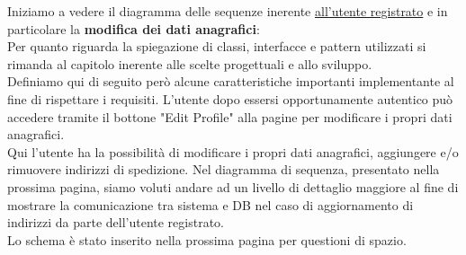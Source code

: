 \documentclass[a4paper,11pt]{report}
\begin{document}
\leavevmode \newline
Iniziamo a vedere il diagramma delle sequenze inerente \underline{all'utente registrato} e in particolare la \textbf{modifica dei dati anagrafici}:\\
Per quanto riguarda la spiegazione di classi, interfacce e pattern utilizzati si rimanda al capitolo inerente alle scelte progettuali e allo sviluppo.\\
Definiamo qui di seguito però alcune caratteristiche importanti implementante al fine di rispettare i requisiti. L'utente dopo essersi opportunamente autentico può accedere tramite il bottone "Edit Profile" alla pagine per modificare i propri dati anagrafici.\\
\newline
Qui l'utente ha la possibilità di modificare i propri dati anagrafici, aggiungere e/o rimuovere indirizzi di spedizione.
\newline
Nel diagramma di sequenza, presentato nella prossima pagina, siamo voluti andare ad un livello di dettaglio maggiore al fine di mostrare la comunicazione tra sistema e DB nel caso di aggiornamento di indirizzi da parte dell'utente registrato.\\

\leavevmode \newline
Lo schema è stato inserito nella prossima pagina per questioni di spazio.\\

\clearpage
\end{document}
